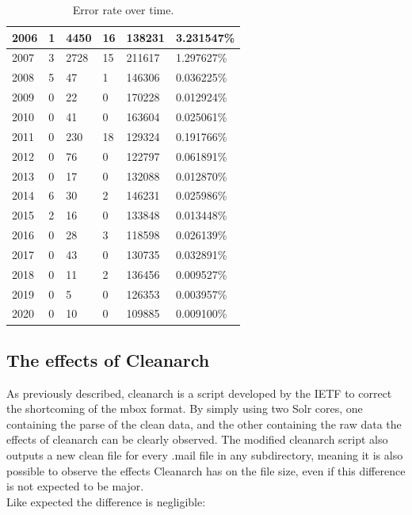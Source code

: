 \documentclass[a4paper,english]{report}
\begin{document}
\begin{center}
\begin{table}[H]
\begin{tabular}{||p{1.2cm}|p{1.2cm}|p{1.7cm}|p{1.5cm}|p{1.5cm}| p{2.5cm} ||}
\hline
2006 & 1 & 4450 & 16 & 138231 & 3.231547\%\\
\hline
2007 & 3 & 2728 & 15 & 211617 & 1.297627\%\\
\hline
2008 & 5 & 47 & 1 & 146306 & 0.036225\%\\
\hline
2009 & 0 & 22 & 0 & 170228 & 0.012924\%\\
\hline
2010 & 0 & 41 & 0 & 163604 & 0.025061\%\\
\hline
2011 & 0 & 230 & 18 & 129324 & 0.191766\%\\
\hline
2012 & 0 & 76 & 0 & 122797 & 0.061891\%\\
\hline
2013 & 0 & 17 & 0 & 132088 & 0.012870\%\\
\hline
2014 & 6 & 30 & 2 & 146231 & 0.025986\%\\
\hline
2015 & 2 & 16 & 0 & 133848 & 0.013448\%\\
\hline
2016 & 0 & 28 & 3 & 118598 & 0.026139\%\\
\hline
2017 & 0 & 43 & 0 & 130735 & 0.032891\%\\
\hline
2018 & 0 & 11 & 2 & 136456 & 0.009527\%\\
\hline
2019 & 0 & 5 & 0 & 126353 & 0.003957\%\\
\hline
2020 & 0 & 10 & 0 & 109885 & 0.009100\%\\
\hline

\end{tabular}
\caption{Error rate over time.}
\end{table}
\end{center}


\subsection{The effects of Cleanarch}

As previously  described, cleanarch is a script developed by the IETF to correct the shortcoming of the mbox format. By simply using two Solr cores, one containing the parse of the clean data, and the other containing the raw data the effects of cleanarch can be clearly observed. 
The modified cleanarch script also outputs a new clean file for every .mail file in any subdirectory, meaning it is also possible to observe the effects Cleanarch has on the file size, even if this difference is not expected to be major.\\

\noindent
Like expected the difference is negligible: \\
\noindent
\end{document}
